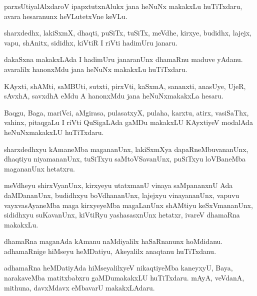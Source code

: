 \documentclass{article}
\begin{document}
\begin{mn}%
parxsUtiyalAlxdaroV ipapxtutxnAlukx jana heNuNx makakxLu huTiTxdaru,
avara hesaranunx heVLutetxVne keVLu.
\end{mn}

\begin{mn}
sharxdedhx, lakiSxmX, dhaqti, puSiTx, tuSiTx, meVdhe, kirxye, budidhx,
lajejx, vapu, shAnitx, sididhx, kiVtiR I riVti hadimUru janaru.
\end{mn}

\begin{mn}
dakaSxna makakxLAda I hadimUru janaranUnx dhamaRnu maduve
yAdanu. avaralilx hanonxMdu jana heNuNx makakxLu huTiTxdaru.
\end{mn}

\begin{mn}
KAyxti, shAMti, saMBUti, sutxti, pirxVti, kaSxmA, sananxti, anasUye,
UjeR, sAvxhA, savxdhA eMdu A hanonxMdu jana heNuNxmakakxLa hesaru.
\end{mn}

\begin{mn}
Baqgu, Baga, mariVci, aMgirasa, pulasatxyX, pulaha, karxtu, atirx,
vasiSaThx, vahinx, pitaqgaLu I riVti QuSigaLAda gaMDu makakxLU
KAyxtiyeV modalAda heNuNxmakakxLU huTiTxdaru.
\end{mn}

\begin{mn}%
sharxdedhxyu kAmaneMba magananUnx, lakiSxmXya dapaRneMbuvananUnx,
dhaqtiyu niyamananUnx, tuSiTxyu saMtoVSavanUnx, puSiTxyu loVBaneMba
magananUnx hetatxru.
\end{mn}

\begin{mn}
meVdheyu shirxVyanUnx, kirxyeyu utatxmanU vinaya saMpananxnU Ada
daMDananUnx, budidhxyu boVdhananUnx, lajejxyu vinayananUnx, vapuvu
vayxvasAyaneMba maga kirxyeyeMba magaLanUnx shAMtiyu keSxVmananUnx,
sididhxyu suKavanUnx, kiVtiRyu yashasasxnUnx hetatxr, ivareV dhamaRna makakxLu.
\end{mn}

\begin{mn}
dhamaRna maganAda kAmanu naMdiyalilx haSaRnanunx
hoMdidanu. adhamaRnige hiMseyu heMDatiyu, Akeyalilx anaqtanu huTiTxdanu.
\end{mn}

\begin{mn}
adhamaRna heMDatiyAda hiMseyalilxyeV nikaqtiyeMba kaneyxyU, Baya,
narakaveMba matitxbabxru gaMDumakakxLU huTiTxdaru. mAyA, veVdanA,
mithuna, davxMdavx eMbavarU makakxLAdaru.
\end{mn}
\end{document}
